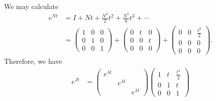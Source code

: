 \documentclass[10pt]{mypackage}
\begin{document}
\begin{example}
\begin{align*}
  \end{align*}
  We may calculate
  \begin{align*}
    e^{Nt} &= I + Nt + \frac{N^2}{2}t^2 + \frac{N^3}{6}t^3 + \cdots\\
           &= \begin{pmatrix}1 & 0 & 0 \\ 0 & 1 & 0 \\ 0 & 0 & 1\end{pmatrix} + \begin{pmatrix}0 & t & 0 \\ 0 & 0 & t \\ 0 & 0 & 0\end{pmatrix} + \begin{pmatrix}0 & 0 & \frac{t^2}{2} \\ 0 & 0 & 0 \\ 0 & 0 & 0\end{pmatrix}.
  \end{align*}
  Therefore, we have
  \begin{align*}
    e^{Jt} &= \begin{pmatrix}e^{\lambda t} & & \\ & e^{\lambda t} & \\ & & e^{\lambda t}\end{pmatrix} \begin{pmatrix}1 & t & \frac{t^2}{2} \\ 0 & 1 & t \\ 0 & 0 & 1\end{pmatrix}
  \end{align*}
\end{example}
\end{document}
